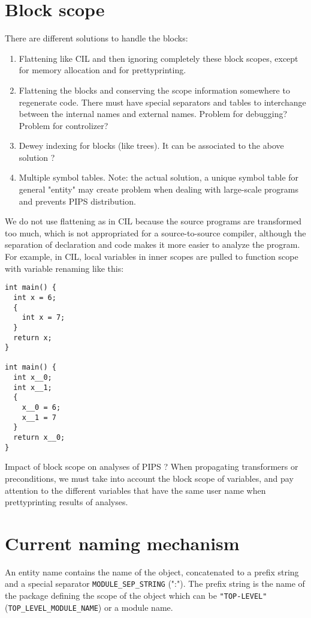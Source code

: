 \documentclass[a4paper]{report}
\begin{document}
\section{Block scope}

There are different solutions to handle the blocks:
\begin{enumerate}
\item Flattening like CIL \cite{Necu02} and then ignoring completely
  these block scopes, except for memory allocation and for
  prettyprinting.
\item Flattening the blocks and conserving the scope information
  somewhere to regenerate code. There must have special separators and
  tables to interchange between the internal names and external
  names. Problem for debugging? Problem for controlizer?
\item Dewey indexing for blocks (like trees). It can be associated to
  the above solution ?
\item Multiple symbol tables. Note: the actual solution, a unique
  symbol table for general "entity" may create problem when dealing
  with large-scale programs and prevents PIPS distribution.
\end{enumerate}
We do not use flattening as in CIL because the source programs are
transformed too much, which is not appropriated for a source-to-source
compiler, although the separation of declaration and code makes it
more easier to analyze the program. For example, in CIL, local
variables in inner scopes are pulled to function scope with variable
renaming like this:
\begin{lstlisting}
int main() {
  int x = 6;
  {
    int x = 7;
  }
  return x;
}

int main() {
  int x__0;
  int x__1; 
  {
    x__0 = 6;
    x__1 = 7
  }
  return x__0;
}
\end{lstlisting}
Impact of block scope on analyses of PIPS ? When propagating
transformers or preconditions, we must take into account the block
scope of variables, and pay attention to the different variables that
have the same user name when prettyprinting results of analyses.

\section{Current naming mechanism}

An entity name contains the name of the object, concatenated to a
prefix string and a special separator \verb/MODULE_SEP_STRING/
(":"). The prefix string is the name of the package defining the scope
of the object which can be \verb/"TOP-LEVEL"/
(\verb/TOP_LEVEL_MODULE_NAME/) or a module name.
\end{document}
